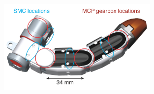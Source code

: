 \documentclass[8pt]{beamer}
\begin{document}
		\begin{frame}
			\begin{center}
				\begin{figure}
					\includegraphics[width=0.7\textwidth]{graphics/finger_motors_mpl.png}
					\label{graph:build}	
					\caption{ \cite{6361492}}
				\end{figure}
			\end{center}
		\end{frame}				
\end{document}
